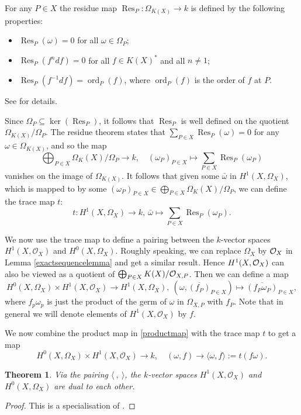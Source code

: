 \documentclass[draft, 11pt]{article} %
\theoremstyle{plain}
\newtheorem{thm}[defn]{Theorem}
\theoremstyle{remark}
\newcommand{\cO}{{\cal O}}
\newcommand{\ra}{\rightarrow}
\newcommand{\hzero}{{H^0(X,\Omega_X)}}
\newcommand{\hone}{H^1(X,\mathcal{O}_X)}
\DeclareMathOperator{\res}{Res}
\DeclareMathOperator{\ord}{ord}
\begin{document}
For any $P\in X$ the residue map $\res_P \colon \Omega_{K(X)} \ra k$ is defined by the following properties:
\begin{itemize}
\item $\res_P(\omega) = 0$ for all $\omega \in \Omega_{P}$;
\item $\res_P(f^ndf) = 0$ for all $f \in K(X)^*$ and all $n \neq 1$;
\item $\res_P(f^{-1}df) = \ord_P(f)$, where $\ord_P(f)$ is the order of $f$ at $P$.
\end{itemize}
See \cite[Chap III, Thm. 7.14.1]{hart} for details.



Since $\Omega_P \subseteq \ker (\res_P)$, it follows that $\res_P$ is well defined on the quotient $\Omega_{K(X)}/\Omega_P$.
The residue theorem \cite[Chap. III, Thm. 7.14.2]{hart} states that $\sum_{P\in X} \res_P(\omega) = 0$ for any $\omega \in \Omega_{K(X)}$, and so the map 
\[
\bigoplus_{P \in X} \Omega_K(X)/\Omega_P \ra k, \quad (\omega_P)_{P \in X} \mapsto \sum_{P\in X} \res_P(\omega_P)
\]
vanishes on the image of $\Omega_{K(X)}$.
It follows that given some $\bar \omega$ in $H^1(X,\Omega_X)$, which is mapped to by some $(\omega_P)_{P \in X} \in \bigoplus_{P \in X} \Omega_K(X)/\Omega_P$, we can define the trace map $t$:
\[
t \colon H^1\left(X, \Omega_X\right) \ra k,\ \bar \omega \mapsto \sum_{P \in X} \res_P(\omega_P).
\]


We now use the trace map to define a pairing between the $k$-vector spaces $\hone$ and $\hzero$.
Roughly speaking, we can replace $\Omega_X$ by $\cO_X$ in Lemma \ref{exactsequencelemma} and get a similar result.
Hence $H^1(X,\cO_X)$ can also be viewed as a quotient of $\bigoplus_{P \in X} K(X)/\cO_{X,P}$.
Then we can define a map 
\begin{equation}\label{productmap}
\hzero \times \hone \ra H^1\left(X, \Omega_X\right), \ (\omega, \overline{(f_P)}_{P \in X}) \mapsto \overline {(f_P  \omega_P)}_{P \in X},
\end{equation}
where $f_p\omega_p$ is just the product of the germ of $\omega$ in $\Omega_{X,P}$ with $f_P$.
Note that in general we will denote elements of $\hone$ by $f$.

We now combine the product map in \eqref{productmap} with the trace map $t$ to get a map 
\[
 \hzero \times \hone \ra k,\quad (\omega, f) \to \langle \omega, f \rangle := t \left( f \omega \right).
\]

\begin{thm}\label{serredualitytheorem}
Via the pairing $\langle\ ,\ \rangle$, the $k$-vector spaces $\hone$ and $\hzero$ are dual to each other.
\end{thm}
\begin{proof}
This is a specialisation of \cite[Thm. 2, Chap. II]{algebraicgroupsandclassfields}.
\end{proof}
\end{document}
